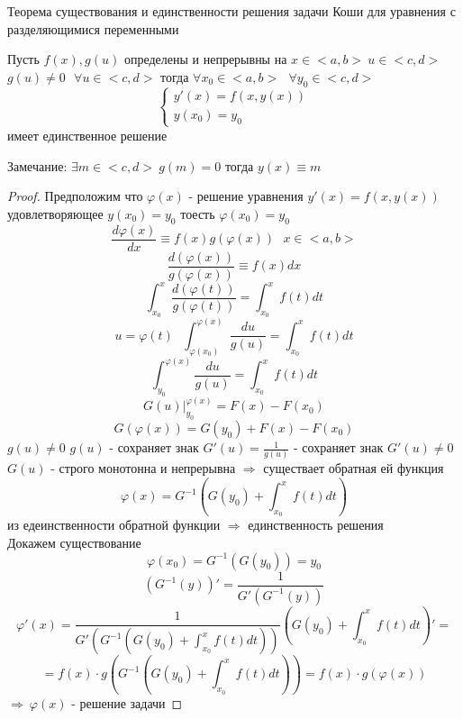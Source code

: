 \begin{title}[\Large]
  Теорема существования и единственности решения задачи Коши для уравнения с
  разделяющимися переменными
\end{title}

\begin{theorem}
  Пусть $f(x), g(u)$ определены и непрерывны на $x \in <a, b> ~ u \in <c, d>$
  $g(u) \not= 0 ~~~ \forall u \in <c, d>$ тогда
  $\forall x_0 \in <a, b> ~~~ \forall y_0 \in <c, d>$
  $$
  \left\{
  \begin{array}{l}
    y'(x) = f(x, y(x)) \\
    y(x_0) = y_0
  \end{array}
  \right.
  $$
  имеет единственное решение

  Замечание: $\exists m \in <c, d> ~ g(m) = 0$ тогда $y(x) \equiv m$
\end{theorem}

\begin{proof}
  Предположим что $\varphi(x)$ - решение уравнения $y'(x) = f(x, y(x))$
  удовлетворяющее $y(x_0) = y_0$ тоесть $\varphi(x_0) = y_0$
  $$
  \frac{d\varphi(x)}{dx} \equiv f(x)g(\varphi(x)) ~~~ x \in <a, b>
  $$
  $$
  \frac{d(\varphi(x))}{g(\varphi(x))} \equiv f(x)dx
  $$
  $$
  \int_{x_0}^x \frac{d(\varphi(t))}{g(\varphi(t))} = \int_{x_0}^x f(t)dt
  $$
  $$
  u = \varphi(t) ~~~ \int_{\varphi(x_0)}^{\varphi(x)} \frac{du}{g(u)} =
  \int_{x_0}^x f(t)dt
  $$
  $$
  \int_{y_0}^{\varphi(x)} \frac{du}{g(u)} = \int_{x_0}^x f(t)dt
  $$
  $$
  G(u) |_{y_0}^{\varphi(x)} = F(x) - F(x_0)
  $$
  $$
  G(\varphi(x)) = G(y_0) + F(x) - F(x_0)
  $$
  $g(u) \not= 0$ $g(u)$ - сохраняет знак $G'(u) = \frac{1}{g(u)}$ - сохраняет
  знак $G'(u) \not= 0$ $G(u)$ - строго монотонна и непрерывна $\Rightarrow$
  существает обратная ей функция
  $$
  \varphi(x) = G^{-1} \left( G(y_0) + \int_{x_0}^x f(t)dt \right)
  $$
  из едеинственности обратной функции $\Rightarrow$ единственность решения \\

  Докажем существование
  $$
  \varphi(x_0) = G^{-1}(G(y_0)) = y_0
  $$
  $$
  (G^{-1}(y))' = \frac{1}{G'(G^{-1}(y))}
  $$
  $$
  \varphi'(x) = \frac{1}{G' \left( G^{-1} \left( G(y_0)
  + \int_{x_0}^x f(t)dt \right) \right)}
  \left( G(y_0) + \int_{x_0}^x f(t)dt \right)' =
  $$
  $$
  = f(x) \cdot g \left( G^{-1} \left( G(y_0) +
  \int_{x_0}^x f(t)dt \right) \right) = f(x) \cdot g(\varphi(x))
  $$
  $\Rightarrow ~ \varphi(x)$ - решение задачи
\end{proof}

